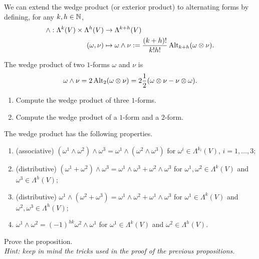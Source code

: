 \begin{definition}
  We can extend the wedge product (or exterior product) to alternating forms by defining, for any $k,h\in\mathbb{N}$,
  \begin{align}
    \wedge : \Lambda^k(V)\times\Lambda^h(V) & \to \Lambda^{k+h}(V)                                                         \\
    (\omega, \nu)                           & \mapsto \omega\wedge\nu := \frac{(k+h)!}{k!h!} \operatorname{Alt}_{k+h}(\omega\otimes\nu).
  \end{align}
\end{definition}

\begin{example}
  The wedge product of two $1$-forms $\omega$ and $\nu$ is
  \begin{equation}
    \omega\wedge\nu = 2\operatorname{Alt}_2(\omega\otimes\nu) = 2 \frac12 (\omega \otimes \nu - \nu \otimes \omega).
  \end{equation}
\end{example}

\begin{exercise}
  \begin{enumerate}
    \item Compute the wedge product of three $1$-forms.
    \item Compute the wedge product of a $1$-form and a $2$-form.
  \end{enumerate}
\end{exercise}

\begin{proposition}
  The wedge product has the following properties.
  \begin{enumerate}
    \item (associative) $(\omega^1\wedge\omega^2)\wedge\omega^3 = \omega^1\wedge(\omega^2\wedge\omega^3)$ for $\omega^i\in\Lambda^{k_i}(V)$, $i=1,\ldots, 3$;
    \item (distributive) $(\omega^1+\omega^2)\wedge\omega^3 = \omega^1\wedge\omega^3+\omega^2\wedge\omega^3$ for $\omega^1,\omega^2\in\Lambda^{k}(V)$ and $\omega^3\in\Lambda^h(V)$;
    \item (distributive) $\omega^1\wedge(\omega^2+\omega^3) = \omega^1\wedge\omega^2+\omega^1\wedge\omega^3$ for $\omega^1\in\Lambda^{k}(V)$ and $\omega^2,\omega^3\in\Lambda^h(V)$;
    \item $\omega^1\wedge\omega^2 = {(-1)}^{hk}\omega^2\wedge\omega^1$ for $\omega^1\in\Lambda^{k}(V)$ and $\omega^2\in\Lambda^h(V)$.
  \end{enumerate}
\end{proposition}
\begin{exercise}
  Prove the proposition.\\
  \textit{\small Hint: keep in mind the tricks used in the proof of the previous propositions.}
\end{exercise}


